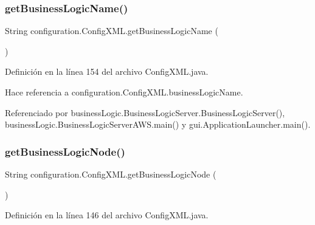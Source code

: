 \subsubsection{\texorpdfstring{getBusinessLogicName()}{getBusinessLogicName()}}
{\footnotesize\ttfamily String configuration.\+Config\+X\+M\+L.\+get\+Business\+Logic\+Name (\begin{DoxyParamCaption}{ }\end{DoxyParamCaption})}



Definición en la línea 154 del archivo Config\+X\+M\+L.\+java.


\begin{DoxyCode}{0}

\end{DoxyCode}


Hace referencia a configuration.\+Config\+X\+M\+L.\+business\+Logic\+Name.



Referenciado por business\+Logic.\+Business\+Logic\+Server.\+Business\+Logic\+Server(), business\+Logic.\+Business\+Logic\+Server\+A\+W\+S.\+main() y gui.\+Application\+Launcher.\+main().

\mbox{\label{classconfiguration_1_1ConfigXML_a6a79b28dd9e0c1c755fef0e7435ec03a}} 
\subsubsection{\texorpdfstring{getBusinessLogicNode()}{getBusinessLogicNode()}}
{\footnotesize\ttfamily String configuration.\+Config\+X\+M\+L.\+get\+Business\+Logic\+Node (\begin{DoxyParamCaption}{ }\end{DoxyParamCaption})}



Definición en la línea 146 del archivo Config\+X\+M\+L.\+java.


\begin{DoxyCode}{0}

\end{DoxyCode}


